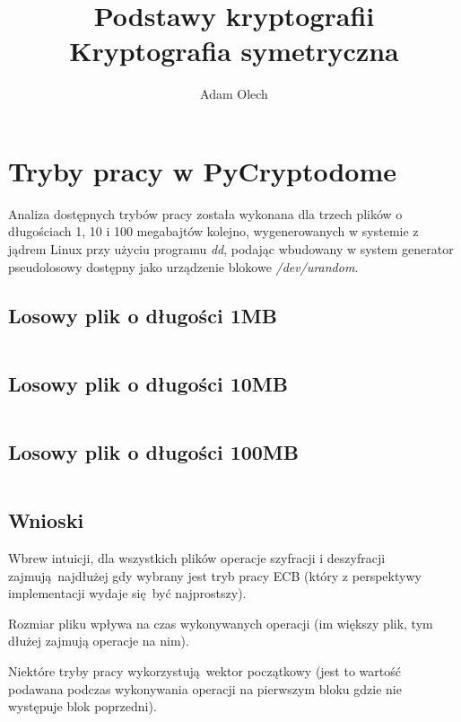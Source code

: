 \documentclass[12pt]{article}
\title{Podstawy kryptografii \\ \large Kryptografia symetryczna}
\author{Adam Olech}
\newenvironment*{dummyenv}{}{}
\begin{document}
\maketitle

\tableofcontents
\newpage

\section{Tryby pracy w PyCryptodome}

Analiza dostępnych trybów pracy została wykonana dla trzech plików o długościach
1, 10 i 100 megabajtów kolejno,
wygenerowanych w systemie z jądrem Linux przy użyciu programu \textit{dd},
podając wbudowany w system generator pseudolosowy dostępny jako urządzenie blokowe \textit{/dev/urandom}.

\subsection{Losowy plik o długości 1MB}

\begin{dummyenv}
	\inputminted[firstline=2,lastline=91]{yaml}{2-enc-dec-time.txt}
\end{dummyenv}

\subsection{Losowy plik o długości 10MB}

\begin{dummyenv}
	\inputminted[firstline=92,lastline=181]{yaml}{2-enc-dec-time.txt}
\end{dummyenv}

\subsection{Losowy plik o długości 100MB}

\begin{dummyenv}
	\inputminted[firstline=182,lastline=271]{yaml}{2-enc-dec-time.txt}
\end{dummyenv}

\subsection{Wnioski}

Wbrew intuicji, dla wszystkich plików operacje szyfracji i deszyfracji
zajmują najdłużej gdy wybrany jest tryb pracy ECB (który z perspektywy implementacji
wydaje się być najprostszy).

Rozmiar pliku wpływa na czas wykonywanych operacji (im większy plik, tym dłużej
zajmują operacje na nim).

Niektóre tryby pracy wykorzystują wektor początkowy (jest to wartość podawana
podczas wykonywania operacji na pierwszym bloku gdzie nie występuje blok poprzedni).
\end{document}
